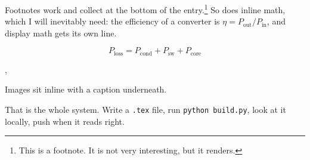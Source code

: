Footnotes work and collect at the bottom of the entry.\footnote{This is a
footnote. It is not very interesting, but it renders.} So does inline math,
which I will inevitably need: the efficiency of a converter is
$\eta = P_{\mathrm{out}} / P_{\mathrm{in}}$, and display math gets its own line.

\[
  P_{\mathrm{loss}} = P_{\mathrm{cond}} + P_{\mathrm{sw}} + P_{\mathrm{core}}
\]

\sep

Images sit inline with a caption underneath.


That is the whole system. Write a \texttt{.tex} file, run \texttt{python
build.py}, look at it locally, push when it reads right.


